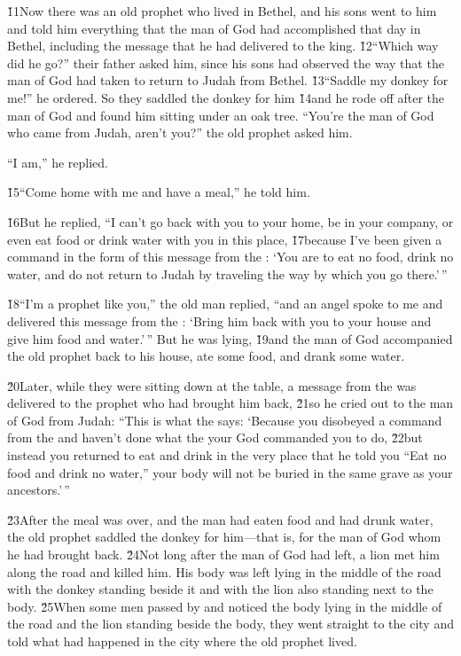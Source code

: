 \v{11}Now there was an old prophet who lived in Bethel, and his sons went to him and told him everything that the man of God had accomplished that day in Bethel, including the message that he had delivered to the king. \v{12}``Which way did he go?'' their father asked him, since his sons had observed the way that the man of God had taken to return to Judah from Bethel. \v{13}``Saddle my donkey for me!'' he ordered. So they saddled the donkey for him \v{14}and he rode off after the man of God and found him sitting under an oak tree. ``You're the man of God who came from Judah, aren't you?'' the old prophet asked him.

``I am,'' he replied.

\v{15}``Come home with me and have a meal,'' he told him.

\v{16}But he replied, ``I can't go back with you to your home, be in your company, or even eat food or drink water with you in this place, \v{17}because I've been given a command in the form of this message from the : `You are to eat no food, drink no water, and do not return to Judah by traveling the way by which you go there.'\,''

\v{18}``I'm a prophet like you,'' the old man replied, ``and an angel spoke to me and delivered this message from the : `Bring him back with you to your house and give him food and water.'\,'' But he was lying, \v{19}and the man of God accompanied the old prophet back to his house, ate some food, and drank some water.

\v{20}Later, while they were sitting down at the table, a message from the  was delivered to the prophet who had brought him back, \v{21}so he cried out to the man of God from Judah: ``This is what the  says: `Because you disobeyed a command from the  and haven't done what the  your God commanded you to do, \v{22}but instead you returned to eat and drink in the very place that he told you ``Eat no food and drink no water,'' your body will not be buried in the same grave as your ancestors.'\,''

\v{23}After the meal was over, and the man had eaten food and had drunk water, the old prophet saddled the donkey for him---that is, for the man of God whom he had brought back. \v{24}Not long after the man of God had left, a lion met him along the road and killed him. His body was left lying in the middle of the road with the donkey standing beside it and with the lion also standing next to the body. \v{25}When some men passed by and noticed the body lying in the middle of the road and the lion standing beside the body, they went straight to the city and told what had happened in the city where the old prophet lived.

